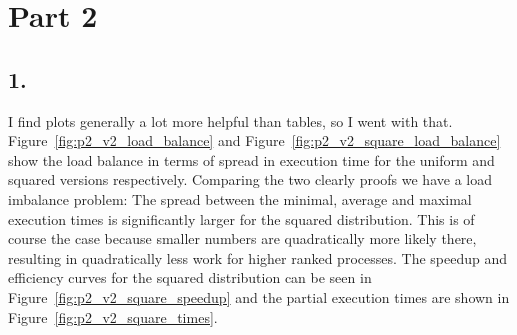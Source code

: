 \documentclass[a4paper, 11pt]{article}
\begin{document}
\section*{Part 2}
\subsection*{1.}
I find plots generally a lot more helpful than tables, so I went with that.
Figure~\ref{fig:p2_v2_load_balance} and
Figure~\ref{fig:p2_v2_square_load_balance} show the load balance in terms of
spread in execution time for the uniform and squared versions respectively.
Comparing the two clearly proofs we have a load imbalance problem: The spread
between the minimal, average and maximal execution times is significantly
larger for the squared distribution. This is of course the case because smaller
numbers are quadratically more likely there, resulting in quadratically less
work for higher ranked processes. The speedup and efficiency curves for the
squared distribution can be seen in Figure~\ref{fig:p2_v2_square_speedup} and
the partial execution times are shown in Figure~\ref{fig:p2_v2_square_times}.
\end{document}
